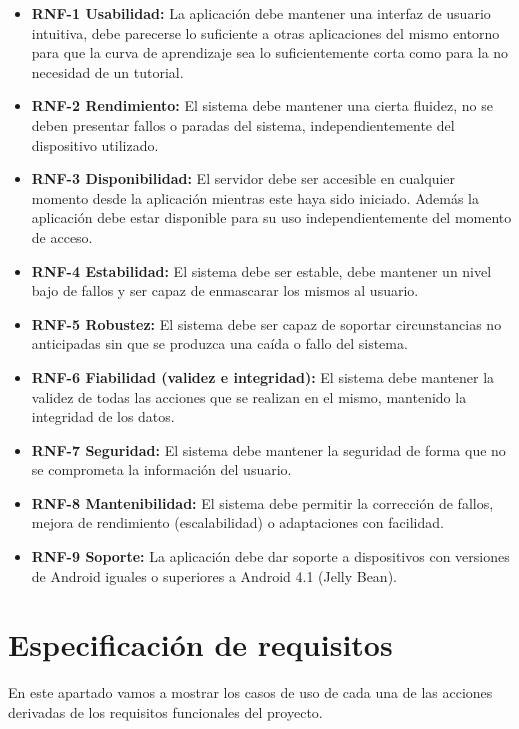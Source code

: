 \begin{itemize}
	\item
		\textbf{RNF-1 Usabilidad:}
			La aplicación debe mantener una interfaz de usuario intuitiva, debe parecerse lo suficiente a otras aplicaciones del mismo entorno para que la curva de aprendizaje sea lo suficientemente corta como para la no necesidad de un tutorial.
	\item
		\textbf{RNF-2 Rendimiento:} 
			El sistema debe mantener una cierta fluidez, no se deben presentar fallos o paradas del sistema, independientemente del dispositivo utilizado.
	\item
		\textbf{RNF-3 Disponibilidad:} 
			El servidor debe ser accesible en cualquier momento desde la aplicación mientras este haya sido iniciado. 
			Además la aplicación debe estar disponible para su uso independientemente del momento de acceso.
	\item
		\textbf{RNF-4 Estabilidad:} 
			El sistema debe ser estable, debe mantener un nivel bajo de fallos y ser capaz de enmascarar los mismos al usuario.
	\item
		\textbf{RNF-5 Robustez:} 
			El sistema debe ser capaz de soportar circunstancias no anticipadas sin que se produzca una caída o fallo del sistema.
	\item
		\textbf{RNF-6 Fiabilidad (validez e integridad):} 
			El sistema debe mantener la validez de todas las acciones que se realizan en el mismo, mantenido la integridad de los datos.
	\item
		\textbf{RNF-7 Seguridad:} 
			El sistema debe mantener la seguridad de forma que no se comprometa la información del usuario.
	\item
		\textbf{RNF-8 Mantenibilidad:} 
			El sistema debe permitir la corrección de fallos, mejora de rendimiento (escalabilidad) o adaptaciones con facilidad.
	\item
		\textbf{RNF-9 Soporte:} 
			La aplicación debe dar soporte a dispositivos con versiones de Android iguales o superiores a Android 4.1 (Jelly Bean).
\end{itemize}



\section{Especificación de requisitos}

En este apartado vamos a mostrar los casos de uso de cada una de las acciones derivadas de los requisitos funcionales del proyecto.

